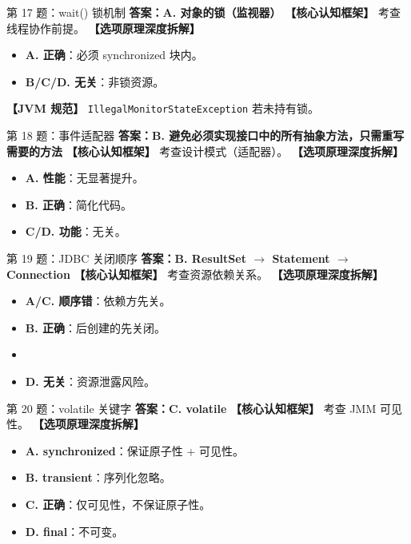 ﻿\documentclass[12pt, a4paper]{ctexart}
\begin{document}
\begin{bluebox}{第 17 题：wait() 锁机制}
	\textbf{答案：A. 对象的锁（监视器）}
	\textbf{【核心认知框架】} 考查线程协作前提。
	\textbf{【选项原理深度拆解】}
	\begin{itemize}[leftmargin=*, nosep]
		\item \textbf{A. 正确}：必须 synchronized 块内。
		\item \textbf{B/C/D. 无关}：非锁资源。
	\end{itemize}
	\textbf{【JVM 规范】} \texttt{IllegalMonitorStateException} 若未持有锁。
\end{bluebox}

\begin{bluebox}{第 18 题：事件适配器}
	\textbf{答案：B. 避免必须实现接口中的所有抽象方法，只需重写需要的方法}
	\textbf{【核心认知框架】} 考查设计模式（适配器）。
	\textbf{【选项原理深度拆解】}
	\begin{itemize}[leftmargin=*, nosep]
		\item \textbf{A. 性能}：无显著提升。
		\item \textbf{B. 正确}：简化代码。
		\item \textbf{C/D. 功能}：无关。
	\end{itemize}
\end{bluebox}

\begin{bluebox}{第 19 题：JDBC 关闭顺序}
	\textbf{答案：B. ResultSet $\rightarrow$ Statement $\rightarrow$ Connection}
	\textbf{【核心认知框架】} 考查资源依赖关系。
	\textbf{【选项原理深度拆解】}
	\begin{itemize}[leftmargin=*, nosep]
		\item \textbf{A/C. 顺序错}：依赖方先关。
		\item \textbf{B. 正确}：后创建的先关闭。
		\item \item \textbf{D. 无关}：资源泄露风险。
	\end{itemize}
\end{bluebox}

\begin{bluebox}{第 20 题：volatile 关键字}
	\textbf{答案：C. volatile}
	\textbf{【核心认知框架】} 考查 JMM 可见性。
	\textbf{【选项原理深度拆解】}
	\begin{itemize}[leftmargin=*, nosep]
		\item \textbf{A. synchronized}：保证原子性 + 可见性。
		\item \textbf{B. transient}：序列化忽略。
		\item \textbf{C. 正确}：仅可见性，不保证原子性。
		\item \textbf{D. final}：不可变。
	\end{itemize}
\end{bluebox}
\end{document}
